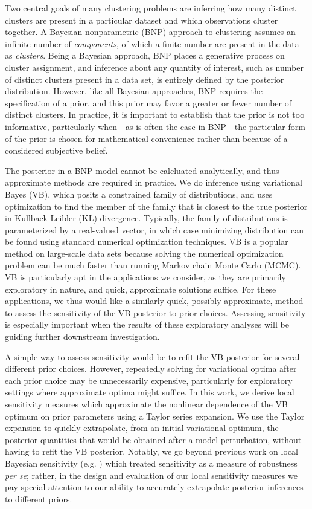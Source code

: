 Two central goals of many clustering problems are inferring how many distinct
clusters are present in a particular dataset and which observations cluster together.
A Bayesian nonparametric (BNP) approach to clustering assumes an infinite
number of \textit{components},
of which a finite number are present in the data as \textit{clusters}.
Being a Bayesian approach, BNP places a generative process
on cluster assignment,
and inference about any quantity of interest,
such as number of distinct clusters present in a data set,
is entirely defined by the posterior distribution.
However, like all Bayesian approaches, BNP requires the specification
of a prior, and this prior may favor a greater or fewer number of distinct clusters.
In practice, it is important to establish that the prior is not too informative, particularly
when---as is often the case in BNP---the particular form of the prior is chosen for
mathematical convenience rather than because of a considered subjective belief.

The posterior in a BNP model cannot be calcluated analytically,
and thus approximate methods are required in practice.
We do inference using variational Bayes (VB), which posits a constrained
family of distributions, and uses optimization to find
the member of the family that is closest to the true posterior in
Kullback-Leibler ($\mathrm{KL}$) divergence.
Typically, the family of distributions is parameterized by a real-valued vector,
in which case minimizing distribution can be found using
standard numerical optimization techniques.
VB is a popular method on large-scale data sets
because solving the numerical optimization problem can be much faster than
running Markov chain Monte Carlo (MCMC).
VB is particularly apt in the applications we consider,
as they are primarily exploratory in nature, and quick, approximate solutions
suffice.
For these applications, we thus would like a similarly quick, possibly approximate,
method to assess
the sensitivity of the VB posterior to prior choices.
Assessing sensitivity is especially important
when the results of these exploratory analyses will be guiding further
downstream investigation.

A simple way to assess sensitivity would be to refit the VB posterior for
several different prior choices.
However, repeatedly solving for variational optima after each prior choice
may be unnecessarily expensive, particularly for exploratory settings where
approximate optima might suffice.
In this work, we derive local sensitivity measures which
approximate the nonlinear dependence of the VB optimum on prior parameters
using a Taylor series expansion.
We use the Taylor expansion to quickly extrapolate,
from an initial variational optimum,
the posterior quantities that would be obtained after a model perturbation,
without having to refit the VB posterior.
Notably, we go beyond previous work on local Bayesian sensitivity (e.g. \citet{basu:1996:local})
which treated sensitivity as a measure of robustness \textit{per se};
rather, in the design and evaluation of our local sensitivity
measures we pay special attention to our ability
to accurately extrapolate posterior inferences to different priors.

